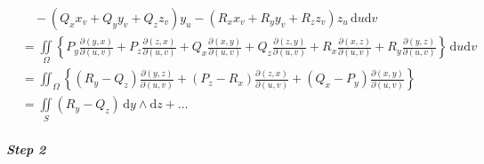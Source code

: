 \begin{align*}
     & \quad-(Q_xx_v+Q_yy_v+Q_zz_v)y_u-(R_xx_v+R_yy_v+R_zz_v)z_u\,\mathrm{d}u\mathrm{d}v                                                                                                                                                                                                                      \\
     & =\iint\limits_{\Omega}\left\{P_y\frac{\partial(y,x)}{\partial(u,v)}+P_z\frac{\partial(z,x)}{\partial(u,v)}+Q_x\frac{\partial(x,y)}{\partial(u,v)}+Q_z\frac{\partial(z,y)}{\partial(u,v)}+R_x\frac{\partial(x,z)}{\partial(u,v)}+R_y\frac{\partial(y,z)}{\partial(u,v)}\right\}\,\mathrm{d}u\mathrm{d}v \\
     & =\iint_{\Omega}\left\{(R_y-Q_z)\frac{\partial(y,z)}{\partial(u,v)}+(P_z-R_x)\frac{\partial(z,x)}{\partial(u,v)}+(Q_x-P_y)\frac{\partial(x,y)}{\partial(u,v)}\right\}                                                                                                                                   \\
     & =\iint\limits_S(R_y-Q_z)\,\mathrm{d}y\wedge\mathrm{d}z+\dots
\end{align*}

\subparagraph*{Step 2}